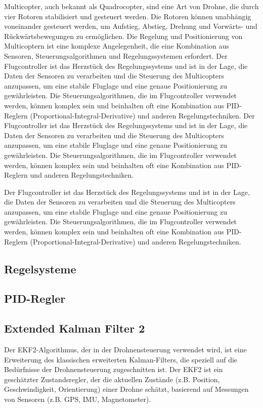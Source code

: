 Multicopter, auch bekannt als Quadrocopter, sind eine Art von Drohne, die durch vier Rotoren stabilisiert und gesteuert werden. Die Rotoren können unabhängig voneinander gesteuert werden, um Aufstieg, Abstieg, Drehung und Vorwärts- und Rückwärtsbewegungen zu ermöglichen. Die Regelung und Positionierung von Multicoptern ist eine komplexe Angelegenheit, die eine Kombination aus Sensoren, Steuerungsalgorithmen und Regelungssystemen erfordert. 
Der Flugcontroller ist das Herzstück des Regelungssystems und ist in der Lage, die Daten der Sensoren zu verarbeiten und die Steuerung des Multicopters anzupassen, um eine stabile Fluglage und eine genaue Positionierung zu gewährleisten. Die Steuerungsalgorithmen, die im Flugcontroller verwendet werden, können komplex sein und beinhalten oft eine Kombination aus PID-Reglern (Proportional-Integral-Derivative) und anderen Regelungstechniken.
Der Flugcontroller ist das Herzstück des Regelungssystems und ist in der Lage, die Daten der Sensoren zu verarbeiten und die Steuerung des Multicopters anzupassen, um eine stabile Fluglage und eine genaue Positionierung zu gewährleisten. Die Steuerungsalgorithmen, die im Flugcontroller verwendet werden, können komplex sein und beinhalten oft eine Kombination aus \ac{PID}-Reglern und anderen Regelungstechniken.

Der Flugcontroller ist das Herzstück des Regelungssystems und ist in der Lage, die Daten der Sensoren zu verarbeiten und die Steuerung des Multicopters anzupassen, um eine stabile Fluglage und eine genaue Positionierung zu gewährleisten. Die Steuerungsalgorithmen, die im Flugcontroller verwendet werden, können komplex sein und beinhalten oft eine Kombination aus PID-Reglern (Proportional-Integral-Derivative) und anderen Regelungstechniken.

\subsection{Regelsysteme} \label{regelsysteme:section}

    \subsection{PID-Regler} \label{pid_regler:subsection}

    \subsection{Extended Kalman Filter 2}
    Der \ac{EKF}2-Algorithmus, der in der Drohnensteuerung verwendet wird, ist eine Erweiterung des klassischen erweiterten Kalman-Filters, die speziell auf die Bedürfnisse der Drohnensteuerung zugeschnitten ist. Der EKF2 ist ein geschätzter Zustandsregler, der die aktuellen Zustände (z.B. Position, Geschwindigkeit, Orientierung) einer Drohne schätzt, basierend auf Messungen von Sensoren (z.B. \ac{GPS}, \ac{IMU}, Magnetometer).

